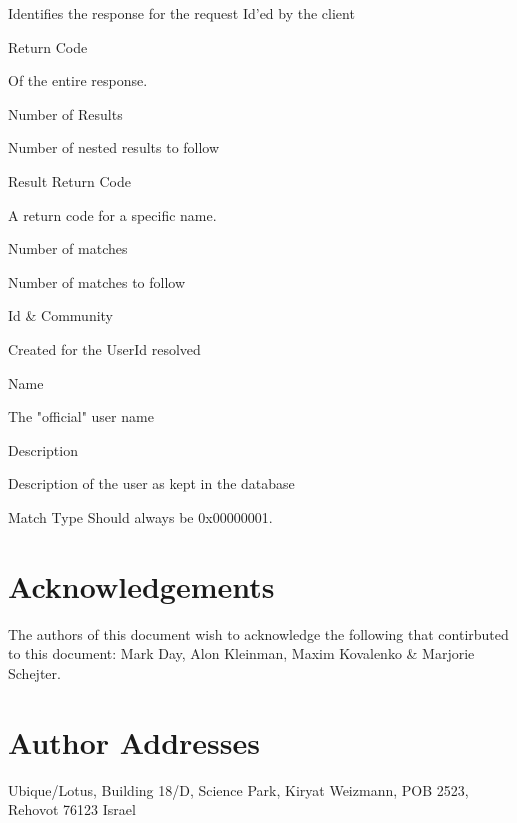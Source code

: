 \documentclass[titlepage,oneside]{book}
\begin{document}
\subpar{}  Identifies the response for the request Id'ed by the client

\par{} Return Code

\subpar{}  Of the entire response.

\par{} Number of Results

\subpar{}  Number of nested results to follow

\par{} Result Return Code

\subpar{}  A return code for a specific name.

\par{} Number of matches

\subpar{}  Number of matches to follow

\par{} Id \& Community

\subpar{}  Created for the UserId resolved

\par{} Name

\subpar{}  The "official" user name

\par{} Description

\subpar{}  Description of the user as kept in the database

\par{} Match Type Should always be 0x00000001.

\chapter{Acknowledgements}

\par{} The authors of this document wish to acknowledge the following
that contirbuted to this document: Mark Day, Alon Kleinman, Maxim
Kovalenko \& Marjorie Schejter.

\chapter{Author Addresses}

\par {} Ubique/Lotus, Building 18/D, Science Park, Kiryat Weizmann,
POB 2523, Rehovot 76123 Israel
\end{document}
